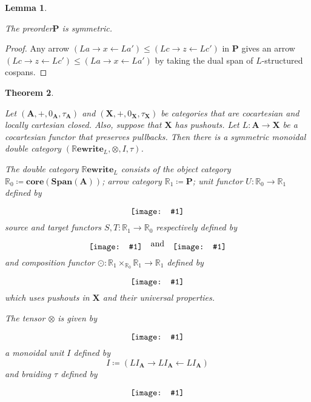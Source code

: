 \documentclass{amsart}
\newcommand{\RR}{\mathbb{R}}
\newcommand{\A}{\cat{A}}
\renewcommand{\P}{\cat{P}}
\newcommand{\X}{\cat{X}}
\newcommand{\core}{\mathbf{core}}
\newcommand{\cat}[1]{\mathbf{#1}}
\newcommand{\from}{\colon}
\newcommand{\diagram}[1]{\raisebox{-0.5\height}{\texttt{[image: \#1]}}}
\newcommand{\Span}{\mathbf{Span}}
\newcommand{\RRewrite}{ \mathbb{R}\mathbf{ewrite} }
\newcommand{\edit}[1]{\textcolor{editcolour}{(#1)}}
\newtheorem{theorem}{Theorem}[section]
\newtheorem{lemma}[theorem]{Lemma}
\theoremstyle{remark}
\theoremstyle{definition}
\begin{document}
\begin{lemma} \label{thm:preord-symm}
  
  The preorder$ \P $ is symmetric.
  
\end{lemma}

\begin{proof}
  
  Any arrow $ ( La \to x \gets La' ) \leq ( Lc \to z \gets Lc' ) $ in
  $ \P $ gives an arrow
  $ ( Lc \to z \gets Lc' ) \leq ( La \to x \gets La' ) $ by taking the
  dual span of $ L $-structured cospans.
  
\end{proof}

\begin{theorem} \label{thm:dbl-rewr-smc}

  Let $ (\A , + , 0_\A , \tau_\A ) $ and
  $ (\X , + , 0_\X , \tau_\X ) $ be categories that are cocartesian
  and locally cartesian closed. Also, suppose that $ \X $ has
  pushouts. Let $ L \from \A \to \X $ be a cocartesian functor that
  preserves pullbacks. Then there is a symmetric monoidal double
  category $ ( \RRewrite_{L} , \otimes , I, \tau ) $.

  The double category $ \RRewrite_{L} $ consists of the object
  category $ \RR_0 \coloneqq \core ( \Span (\A) ) $; arrow category
  $ \RR_1 \coloneqq \P $; unit functor $ U \from \RR_0 \to \RR_1 $
  defined by
  \[
    \diagram{diag_nlr_dbl-rewrite-unit-functor}
  \]
  source and target functors $ S , T \from \RR_1 \to \RR_0 $
  respectively defined by
  \[
    \diagram{diag_nlr_dbl-rewrite-source-functor} \quad \text{and}
    \quad \diagram{diag_nlr_dbl-rewrite-target-functor}
  \]
  and composition functor
  $ \odot \from \RR_1 \times_{\RR_0} \RR_1 \to \RR_1 $ defined by
  \[
    \diagram{diag_nlr_dbl-rewrite-composition-functor}
  \]
  which uses pushouts in $ \X $ and their universal properties.
	 
  The tensor $ \otimes $ is given by
  \[ \diagram{diag_nlr_dbl-rewrite-tensor} \]
  a monoidal unit $ I $ defined by
  \[
    I \coloneqq ( L I_{\A} \to L I_{\A} \gets L I_{\A} )
  \]
  and braiding $ \tau $ defined by
  \[
    \diagram{diag_nlr_dbl-rewrite-braiding}
  \]
         
\end{theorem}
\end{document}
